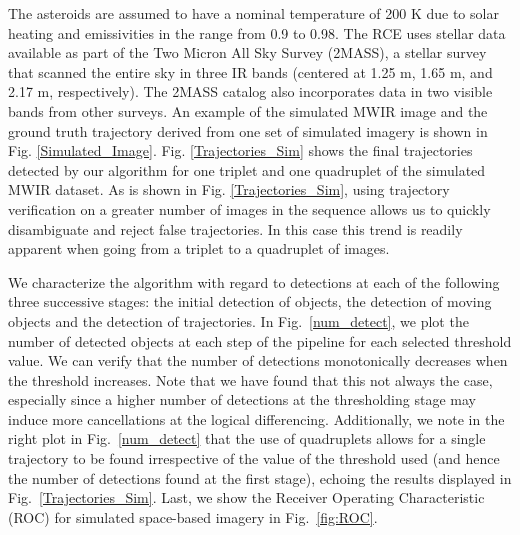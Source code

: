  The asteroids are assumed to have a nominal temperature of 200 K due to solar heating and emissivities in the range from 0.9 to 0.98. 
 The RCE uses stellar data available as part of the Two Micron All Sky Survey (2MASS), a stellar survey that scanned the entire sky in three IR bands (centered at 1.25 \textmu m, 1.65 \textmu m, and 2.17 \textmu m, respectively).  The 2MASS catalog also incorporates data in two visible bands from other surveys. 
 An example of the simulated MWIR image and the ground truth trajectory derived from one set of simulated imagery is shown in Fig. \ref{Simulated_Image}. 
 Fig. \ref{Trajectories_Sim} shows the final trajectories detected by our algorithm for one triplet and one quadruplet of the simulated MWIR dataset. As is shown in Fig. \ref{Trajectories_Sim}, using trajectory verification on a greater number of images in the sequence allows us to quickly disambiguate and reject false trajectories. In this case this trend is readily apparent when going from a triplet to a quadruplet of images.
%

We characterize the algorithm with regard to detections at each of the following three successive stages: the initial detection of objects, the detection of moving objects and the detection of trajectories.
In Fig.~\ref{num_detect}, we plot the number of detected objects at each step of the pipeline for each selected threshold value. We can verify that the number of detections monotonically decreases when the threshold increases. Note that we have found that this not always the case, especially since a higher number of detections at the thresholding stage may induce more cancellations at the logical differencing. Additionally, we note in the right plot in Fig.~\ref{num_detect} that the use of quadruplets allows for a single trajectory to be found irrespective of the value of the threshold used (and hence the number of detections found at the first stage), echoing the results displayed in Fig.~\ref{Trajectories_Sim}.
%
Last, we show the Receiver Operating Characteristic (ROC) for simulated space-based imagery in Fig.~\ref{fig:ROC}.  
%

